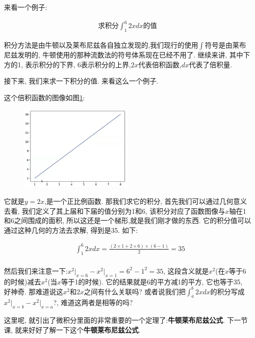 来看一个例子:

\begin{align*}
  \mbox{求积分}\int_1^6 2xdx\mbox{的值}
\end{align*}

积分方法是由牛顿以及莱布尼兹各自独立发现的,我们现行的使用$\int$符号是由莱布尼兹发明的, 牛顿使用的那种流数法的符号体系现在已经不用了. 继续来讲, 其中下方的1, 表示积分的下界, 6表示积分的上界,$2x$代表倍积函数,$dx$代表了倍积量. 

接下来, 我们来求一下积分的值. 来看这么一个例子. 

这个倍积函数的图像如图\ref{fig:img13_13}:

\begin{figure}[ht]
  \centering
  \includegraphics[width=0.5\textwidth]{asset/20230903200439.png}
  \caption{}
  \label{fig:img13_13}
\end{figure}

它就是$y=2x$,是一个正比例函数. 那我们求它的积分, 首先我们可以通过几何意义去看, 我们定义了其上届和下届的值分别为1和6, 该积分对应了函数图像与$x$轴在1和6之间围成的面积, 所以这还是一个梯形,就是我们刚才做的东西. 它的积分值可以通过这种几何的方法去求解, 得到是35. 如下:

\begin{align*}
& \int_1^6 2xdx = \frac{(2 \times 1 + 2 \times 6)\times(6-1)}{2} = 35 \\
\end{align*}

然后我们来注意一下:$x^2\vert _{x=6}-x^2 \vert _{x=1}=6^2 - 1^2 = 35$, 这段含义就是$x^2$(在$x$等于6的时候)减去$x^2$(当$x$等于1的时候). 它的结果就是6的平方减1的平方, 它也等于35, 好神奇. 那难道说这$x^2$和$2x$之间有什么关联吗? 或者说我们把$\int_a^b2xdx$的积分写成$x^2\vert_{x=b}-x^2 \vert_{x=a}$?, 难道这两者是相等的吗? 

这里呢, 就引出了微积分里面的非常重要的一个定理了:\textbf{牛顿莱布尼兹公式}. 下一节课, 就来好好了解一下这个\textbf{牛顿莱布尼兹公式}. 